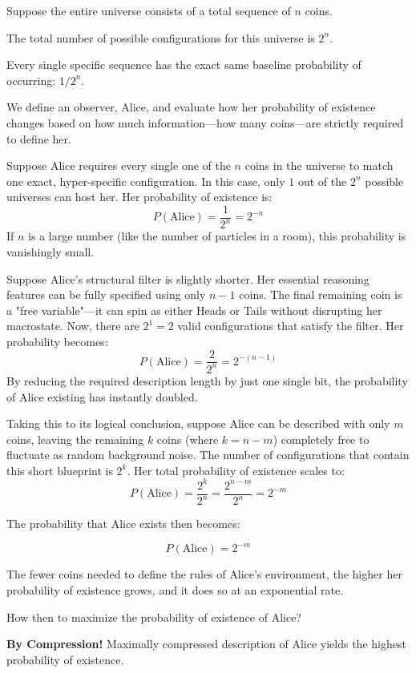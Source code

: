 Suppose the entire universe consists of a total sequence of $n$ coins.

The total number of possible configurations for this universe is $2^n$.

Every single specific sequence has the exact same baseline probability of occurring: $1/2^n$. 

We define an observer, Alice, and evaluate how her probability of existence changes based on how much information—how many coins—are strictly required to define her.

Suppose Alice requires every single one of the $n$ coins in the universe to match one exact, hyper-specific configuration. In this case, only $1$ out of the $2^n$ possible universes can host her. Her probability of existence is:
$$P(\text{Alice}) = \frac{1}{2^n} = 2^{-n}$$
If $n$ is a large number (like the number of particles in a room), this probability is vanishingly small.
    
Suppose Alice's structural filter is slightly shorter.
Her essential reasoning features can be fully specified using only $n-1$ coins.
The final remaining coin is a "free variable"—it can spin as either Heads or Tails without disrupting her macrostate.
Now, there are $2^1 = 2$ valid configurations that satisfy the filter. Her probability becomes:
    $$P(\text{Alice}) = \frac{2}{2^n} = 2^{-(n-1)}$$
    By reducing the required description length by just one single bit, the probability of Alice existing has instantly doubled.
    
Taking this to its logical conclusion, suppose Alice can be described with only $m$ coins, leaving the remaining $k$ coins (where $k = n-m$) completely free to fluctuate as random background noise.
The number of configurations that contain this short blueprint is $2^k$. Her total probability of existence scales to:
$$P(\text{Alice}) = \frac{2^k}{2^n} = \frac{2^{n-m}}{2^n} = 2^{-m}$$


The probability that Alice exists then becomes:

\[
P(\text{Alice}) = 2^{-m}
\]


The fewer coins needed to define the rules of Alice's environment, the higher her probability of existence grows, and it does so at an exponential rate. 

How then to maximize the probability of existence of Alice? 

\textbf{By Compression!} Maximally compressed description of Alice yields the highest probability of existence.


